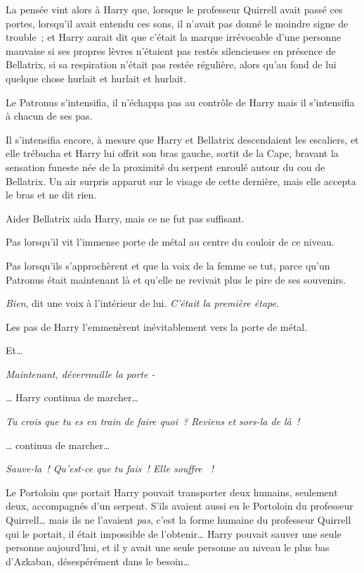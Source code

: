 La pensée vint alors à Harry que, lorsque le professeur Quirrell avait passé ces portes, lorsqu'il avait entendu ces sons, il n'avait pas donné le moindre signe de trouble~; et Harry aurait dit que c'était la marque irrévocable d'une personne mauvaise si ses propres lèvres n'étaient pas restés silencieuses en présence de Bellatrix, si sa respiration n'était pas restée régulière, alors qu'au fond de lui quelque chose hurlait et hurlait et hurlait.

Le Patronus s'intensifia, il n'échappa pas au contrôle de Harry mais il s'intensifia à chacun de ses pas.

Il s'intensifia encore, à mesure que Harry et Bellatrix descendaient les escaliers, et elle trébucha et Harry lui offrit son bras gauche, sortit de la Cape, bravant la sensation funeste née de la proximité du serpent enroulé autour du cou de Bellatrix. Un air surpris apparut sur le visage de cette dernière, mais elle accepta le bras et ne dit rien.

Aider Bellatrix aida Harry, mais ce ne fut pas suffisant.

Pas lorsqu'il vit l'immense porte de métal au centre du couloir de ce niveau.

Pas lorsqu'ils s'approchèrent et que la voix de la femme se tut, parce qu'un Patronus était maintenant là et qu'elle ne revivait plus le pire de ses souvenirs.

\emph{Bien}, dit une voix à l'intérieur de lui. \emph{C'était la première étape}.

Les pas de Harry l'emmenèrent inévitablement vers la porte de métal.

Et…

\emph{Maintenant, déverrouille la porte -}

… Harry continua de marcher…

\emph{Tu crois que tu es en train de faire quoi~? Reviens et sors-la de là~!}

… continua de marcher…

\emph{Sauve-la~! Qu'est-ce que tu fais~! Elle souffre ~!}

Le Portoloin que portait Harry pouvait transporter deux humains, seulement deux, accompagnés d'un serpent. S'ils avaient aussi eu le Portoloin du professeur Quirrell… mais ils ne l'avaient \emph{pas}, c'est la forme humaine du professeur Quirrell qui le portait, il était impossible de l'obtenir… Harry pouvait sauver une seule personne aujourd'hui, et il y avait une seule personne au niveau le plus bas d'Azkaban, désespérément dans le besoin…

